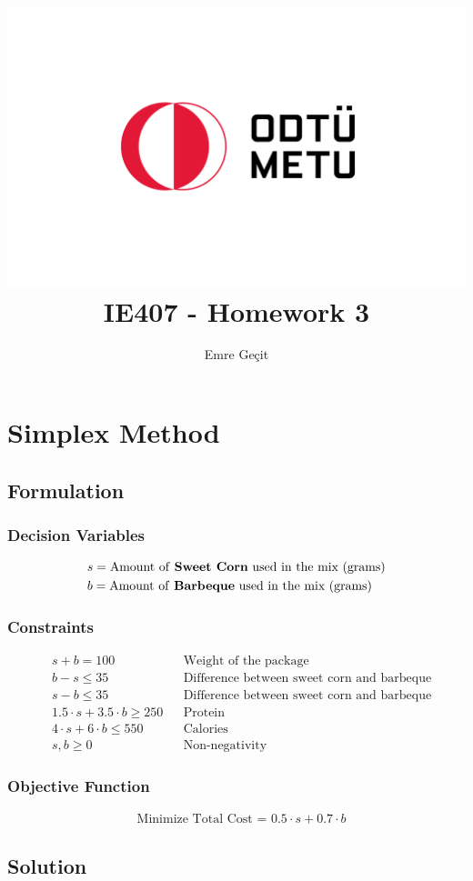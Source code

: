 \documentclass{article}
\author{Emre Geçit}
\title{\includegraphics{9.4.png}\\ IE407 - Homework 3}
\begin{document}
\maketitle

\newpage

\section{Simplex Method}

\subsection{Formulation}
\subsubsection*{Decision Variables}
\begin{align*}
    &s = \text{Amount of \textbf{Sweet Corn} used in the mix (grams)}\\
    &b = \text{Amount of \textbf{Barbeque} used in the mix (grams)}\\
\end{align*}

\subsubsection*{Constraints}
\begin{align*}
    &s + b = 100 && \text{Weight of the package}\\
    &b - s \leq 35 && \text{Difference between sweet corn and barbeque}\\
    &s - b \leq 35 && \text{Difference between sweet corn and barbeque}\\
    &1.5 \cdot s + 3.5 \cdot b \geq 250 && \text{Protein}\\
    &4 \cdot s + 6 \cdot b \leq 550 && \text{Calories}\\
    &s, b \geq 0 && \text{Non-negativity}
\end{align*}

\subsubsection*{Objective Function}
\begin{align*}
    &\text{Minimize Total Cost = } 0.5 \cdot s + 0.7 \cdot b
\end{align*}

\subsection{Solution}
\end{document}
